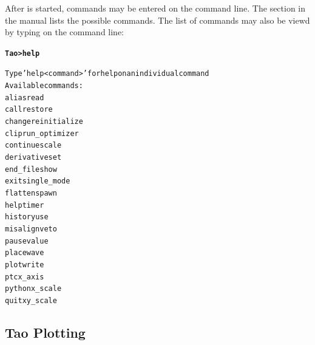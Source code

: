 \documentclass{hitec}
\newcommand{\BF}[1]{{\normalfont\textbf{#1}}}
\begin{document}
After \tao is started, commands may be entered on the command line. The section
\tao {} in the \tao manual lists the possible commands. The list
of commands may also be viewd by typing  on the command line:
\begin{alltt}
  \BF{Tao> help}

  Type 'help <command>' for help on an individual command
  Available commands:
    alias                             read
    call                              restore
    change                            reinitialize
    clip                              run_optimizer
    continue                          scale
    derivative                        set
    end_file                          show
    exit                              single_mode
    flatten                           spawn
    help                              timer
    history                           use
    misalign                          veto
    pause                             value
    place                             wave
    plot                              write
    ptc                               x_axis
    python                            x_scale
    quit                              xy_scale
\end{alltt}

\subsection{Tao Plotting}
\end{document}
